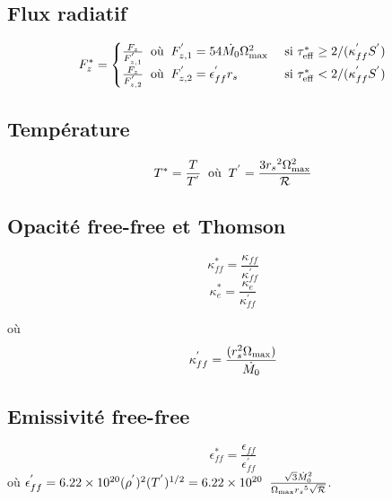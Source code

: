 \documentclass[a4paper,11pt]{article}
\begin{document}
\subsection{Flux radiatif}
    \begin{equation}
      F_z^* =
      \begin{cases}
         \frac{F_z}{F_{z,1}^{'}} \;\; \textrm{où} \;\; F_{z,1}^{'} = 54 \dot{M_0} \Omega_{\rm{max}}^2 & \text{ si } \tau_{\rm{eff}}^* \geq 2/(\kappa_{ff}^{'} S^{'}) \\
         \frac{F_z}{F_{z,2}^{'}} \;\; \textrm{où} \;\; F_{z,2}^{'} = \epsilon_{ff}^{'} r_s & \text{ si } \tau_{\rm{eff}}^* < 2/(\kappa_{ff}^{'} S^{'})
      \end{cases}
    \end{equation}
    
\subsection{Température}
    \begin{equation}
        T^*=\frac{T}{T^{'}}\;\; \textrm{où} \;\;T^{'}=\frac{3{r_s}^2\Omega_{\rm{max}}^2}{\mathcal{R}}
    \end{equation}

\subsection{Opacité free-free et Thomson}
    \begin{equation}
        \kappa_{ff}^* = \frac{\kappa_{ff}}{\kappa_{ff}^{'}}
    \end{equation}
    \begin{equation}
        \kappa_{e}^* = \frac{\kappa_{e}}{\kappa_{ff}^{'}}
    \end{equation}

                                    où 
    \begin{equation}
        \kappa_{ff}^{'} = \frac{(r_s^2 \Omega_{\rm{max}})}{\dot{M_0}}
    \end{equation}


\subsection{Emissivité free-free}
    \begin{equation}
        \epsilon_{ff}^* = \frac{\epsilon_{ff}}{\epsilon_{ff}^{'}}
    \end{equation}
où $\epsilon_{ff}^{'} = 6.22 \times 10^{20} (\rho^{'})^2 (T^{'})^{1/2}=6.22 \times 10^{20}\;\;\frac{\sqrt{3}{\dot{M}_0}^2}{\Omega_{\rm{max}}{r_s}^5\sqrt{\mathcal{R}}}$.
\end{document}
